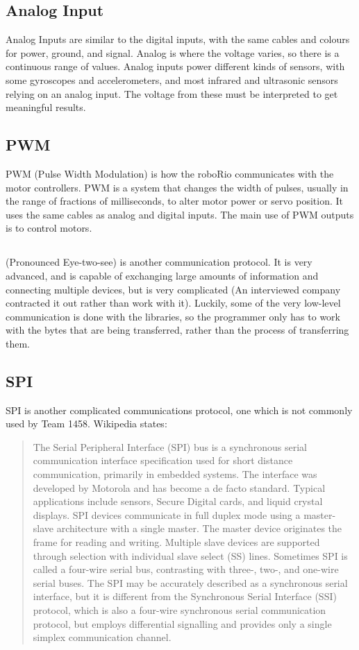 \documentclass[]{report}
\begin{document}
\subsection{Analog Input}
	Analog Inputs are similar to the digital inputs, with the same cables and colours for power, ground, and signal.
	Analog is where the voltage varies, so there is a continuous range of values.
	Analog inputs power different kinds of sensors, with some gyroscopes and accelerometers, and most infrared and ultrasonic sensors relying on an analog input. The voltage from these must be interpreted to get meaningful results.

\subsection{PWM}
	PWM (Pulse Width Modulation) is how the roboRio communicates with the motor controllers.
	PWM is a system that changes the width of pulses, usually in the range of fractions of milliseconds, to alter motor power or servo position.
	It uses the same cables as analog and digital inputs.
	The main use of PWM outputs is to control motors.

\subsection{\ITwoC}
	\ITwoC (Pronounced Eye-two-see) is another communication protocol.
	It is very advanced, and is capable of exchanging large amounts of information and connecting multiple devices, but is very complicated (An interviewed company contracted it out rather than work with it).
	Luckily, some of the very low-level communication is done with the libraries, so the programmer only has to work with the bytes that are being transferred, rather than the process of transferring them.
\subsection{SPI}
	SPI is another complicated communications protocol, one which is not commonly used by Team 1458.
	Wikipedia states:
	\begin{quotation}
	The Serial Peripheral Interface (SPI) bus is a synchronous serial communication interface specification used for short distance communication, primarily in embedded systems.
	The interface was developed by Motorola and has become a de facto standard.
	Typical applications include sensors, Secure Digital cards, and liquid crystal displays.
	SPI devices communicate in full duplex mode using a master-slave architecture with a single master.
	The master device originates the frame for reading and writing. Multiple slave devices are supported through selection with individual slave select (SS) lines.
	Sometimes SPI is called a four-wire serial bus, contrasting with three-, two-, and one-wire serial buses.
	The SPI may be accurately described as a synchronous serial interface, but it is different from the Synchronous Serial Interface (SSI) protocol, which is also a four-wire synchronous serial communication protocol, but employs differential signalling and provides only a single simplex communication channel.
\end{quotation}
\end{document}
